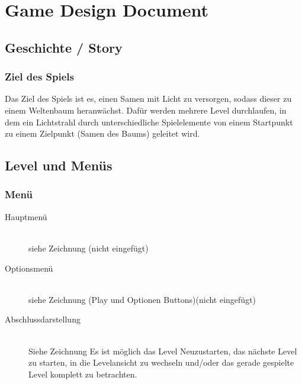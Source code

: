 \section{Game Design Document}
\label{ganmeDesignDoku}
\subsection{Geschichte / Story}
\subsubsection{Ziel des Spiels}
Das Ziel des Spiels ist es, einen Samen mit Licht zu versorgen, sodass dieser zu einem Weltenbaum heranwächst. Dafür werden mehrere Level durchlaufen, in dem ein Lichtstrahl durch unterschiedliche Spielelemente von einem Startpunkt zu einem Zielpunkt (Samen des Baums) geleitet wird.

\subsection{Level und Menüs}
\subsubsection{Menü}
\begin{description}

\item [Hauptmenü] \hfill \\
siehe Zeichnung (nicht eingefügt)

\item [Optionsmenü] \hfill \\
siehe Zeichnung (Play und Optionen Buttons)(nicht eingefügt)

\item [Abschlussdarstellung] \hfill \\
Siehe Zeichnung
Es ist möglich das Level Neuzustarten, das nächste Level zu starten, in die Levelansicht zu wechseln und/oder das gerade gespielte Level komplett zu betrachten. 
\end{description}
